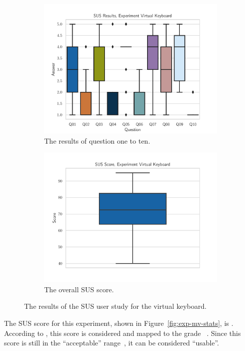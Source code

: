 \begin{figure}[H]
  \centering
  \begin{subfigure}{.5\linewidth}%
    \centering
    \includegraphics[width=\linewidth]{figures/evaluation/res_exp_vk.pdf}
    \caption{The results of question one to ten.}\label{fig:res-exp-vk}
  \end{subfigure}%
  \begin{subfigure}{.5\linewidth}%
    \centering
    \includegraphics[width=\linewidth]{figures/evaluation/score_exp_vk.pdf}
    \caption{The overall \ac{SUS} score.}\label{fig:score-exp-vk}
  \end{subfigure}%
  \caption[User study results of the virtual keyboard experiment]{The results of the \ac{SUS} user study for the virtual keyboard.}\label{fig:exp-vk-stats}
\end{figure}

The \ac{SUS} score for this experiment, shown in Figure~\ref{fig:exp-mv-stats}, is \evalExpVkSusScore{}.
According to \citeauthor{Bangor.2009}, this score is considered \evalExpVkSusAdj{} and mapped to the grade \evalExpVkSusGrade~\cite[120\psq]{Bangor.2009}. Since this score is still in the \enquote{acceptable} range~\cite[120\psq]{Bangor.2009}, it can be considered \enquote{usable}.

